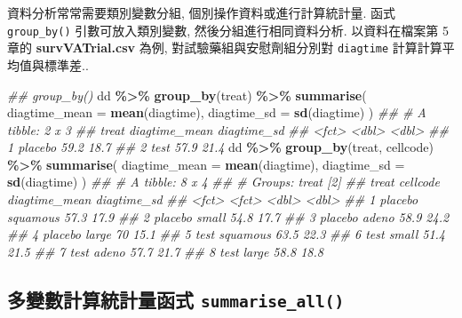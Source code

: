\documentclass[
]{book}
\newenvironment{Shaded}{\begin{snugshade}}{\end{snugshade}}
\newcommand{\CommentTok}[1]{\textcolor[rgb]{0.56,0.35,0.01}{\textit{#1}}}
\newcommand{\DataTypeTok}[1]{\textcolor[rgb]{0.13,0.29,0.53}{#1}}
\newcommand{\KeywordTok}[1]{\textcolor[rgb]{0.13,0.29,0.53}{\textbf{#1}}}
\newcommand{\NormalTok}[1]{#1}
\newcommand{\OperatorTok}[1]{\textcolor[rgb]{0.81,0.36,0.00}{\textbf{#1}}}
\newcommand{\StringTok}[1]{\textcolor[rgb]{0.31,0.60,0.02}{#1}}
\begin{document}
資料分析常常需要類別變數分組, 個別操作資料或進行計算統計量.
函式 \texttt{group\_by()} 引數可放入類別變數, 然後分組進行相同資料分析.
以資料在檔案第 5 章的 \textbf{survVATrial.csv} 為例,
對試驗藥組與安慰劑組分別對 \texttt{diagtime} 計算計算平均值與標準差..

\begin{Shaded}
\begin{Highlighting}[]
\CommentTok{\#\# group\_by()}
\NormalTok{dd }\OperatorTok{\%\textgreater{}\%}\StringTok{ }
\StringTok{  }\KeywordTok{group\_by}\NormalTok{(treat) }\OperatorTok{\%\textgreater{}\%}\StringTok{ }
\StringTok{  }\KeywordTok{summarise}\NormalTok{(}
    \DataTypeTok{diagtime\_mean =} \KeywordTok{mean}\NormalTok{(diagtime),}
    \DataTypeTok{diagtime\_sd =} \KeywordTok{sd}\NormalTok{(diagtime)}
\NormalTok{    )}
\CommentTok{\#\# \# A tibble: 2 x 3}
\CommentTok{\#\#   treat   diagtime\_mean diagtime\_sd}
\CommentTok{\#\#   \textless{}fct\textgreater{}           \textless{}dbl\textgreater{}       \textless{}dbl\textgreater{}}
\CommentTok{\#\# 1 placebo          59.2        18.7}
\CommentTok{\#\# 2 test             57.9        21.4}
\NormalTok{dd }\OperatorTok{\%\textgreater{}\%}\StringTok{ }
\StringTok{  }\KeywordTok{group\_by}\NormalTok{(treat, cellcode) }\OperatorTok{\%\textgreater{}\%}\StringTok{ }
\StringTok{  }\KeywordTok{summarise}\NormalTok{(}
    \DataTypeTok{diagtime\_mean =} \KeywordTok{mean}\NormalTok{(diagtime),}
    \DataTypeTok{diagtime\_sd =} \KeywordTok{sd}\NormalTok{(diagtime)}
\NormalTok{    )}
\CommentTok{\#\# \# A tibble: 8 x 4}
\CommentTok{\#\# \# Groups:   treat [2]}
\CommentTok{\#\#   treat   cellcode diagtime\_mean diagtime\_sd}
\CommentTok{\#\#   \textless{}fct\textgreater{}   \textless{}fct\textgreater{}            \textless{}dbl\textgreater{}       \textless{}dbl\textgreater{}}
\CommentTok{\#\# 1 placebo squamous          57.3        17.9}
\CommentTok{\#\# 2 placebo small             54.8        17.7}
\CommentTok{\#\# 3 placebo adeno             58.9        24.2}
\CommentTok{\#\# 4 placebo large             70          15.1}
\CommentTok{\#\# 5 test    squamous          63.5        22.3}
\CommentTok{\#\# 6 test    small             51.4        21.5}
\CommentTok{\#\# 7 test    adeno             57.7        21.7}
\CommentTok{\#\# 8 test    large             58.8        18.8}
\end{Highlighting}
\end{Shaded}

\hypertarget{ux591aux8b8aux6578ux8a08ux7b97ux7d71ux8a08ux91cfux51fdux5f0f-summarise_all}{%
\subsection{\texorpdfstring{多變數計算統計量函式 \texttt{summarise\_all()}}{多變數計算統計量函式 summarise\_all()}}\label{ux591aux8b8aux6578ux8a08ux7b97ux7d71ux8a08ux91cfux51fdux5f0f-summarise_all}}
\end{document}
